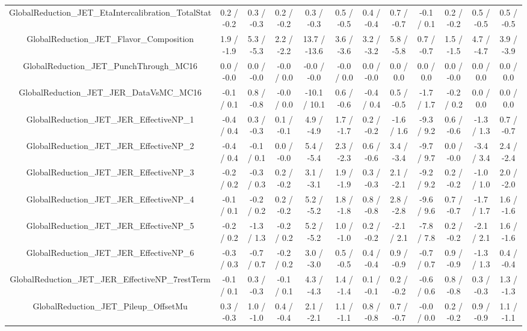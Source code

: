 \begin{table}[htbp]
\begin{center}
\begin{tabular}{|c|c|c|c|c|c|c|c|c|c|c|c|}
  GlobalReduction_JET_EtaIntercalibration_TotalStat & 0.2 / -0.2 & 0.3 / -0.3 & 0.2 / -0.2 & 0.3 / -0.3 & 0.5 / -0.5 & 0.4 / -0.4 & 0.7 / -0.7 & -0.1 / 0.1 & 0.2 / -0.2 & 0.5 / -0.5 & 0.5 / -0.5 \\ 
  GlobalReduction_JET_Flavor_Composition & 1.9 / -1.9 & 5.3 / -5.3 & 2.2 / -2.2 & 13.7 / -13.6 & 3.6 / -3.6 & 3.2 / -3.2 & 5.8 / -5.8 & 0.7 / -0.7 & 1.5 / -1.5 & 4.7 / -4.7 & 3.9 / -3.9 \\ 
  GlobalReduction_JET_PunchThrough_MC16 & 0.0 / -0.0 & 0.0 / -0.0 & -0.0 / 0.0 & -0.0 / -0.0 & -0.0 / 0.0 & 0.0 / -0.0 & 0.0 / 0.0 & 0.0 / 0.0 & 0.0 / -0.0 & 0.0 / 0.0 & 0.0 / 0.0 \\ 
  GlobalReduction_JET_JER_DataVsMC_MC16 & -0.1 / 0.1 & 0.8 / -0.8 & -0.0 / 0.0 & -10.1 / 10.1 & 0.6 / -0.6 & -0.4 / 0.4 & 0.5 / -0.5 & -1.7 / 1.7 & -0.2 / 0.2 & 0.0 / 0.0 & 0.0 / 0.0 \\ 
  GlobalReduction_JET_JER_EffectiveNP_1 & -0.4 / 0.4 & 0.3 / -0.3 & 0.1 / -0.1 & 4.9 / -4.9 & 1.7 / -1.7 & 0.2 / -0.2 & -1.6 / 1.6 & -9.3 / 9.2 & 0.6 / -0.6 & -1.3 / 1.3 & 0.7 / -0.7 \\ 
  GlobalReduction_JET_JER_EffectiveNP_2 & -0.4 / 0.4 & -0.1 / 0.1 & 0.0 / -0.0 & 5.4 / -5.4 & 2.3 / -2.3 & 0.6 / -0.6 & 3.4 / -3.4 & -9.7 / 9.7 & 0.0 / -0.0 & -3.4 / 3.4 & 2.4 / -2.4 \\ 
  GlobalReduction_JET_JER_EffectiveNP_3 & -0.2 / 0.2 & -0.3 / 0.3 & 0.2 / -0.2 & 3.1 / -3.1 & 1.9 / -1.9 & 0.3 / -0.3 & 2.1 / -2.1 & -9.2 / 9.2 & 0.2 / -0.2 & -1.0 / 1.0 & 2.0 / -2.0 \\ 
  GlobalReduction_JET_JER_EffectiveNP_4 & -0.1 / 0.1 & -0.2 / 0.2 & 0.2 / -0.2 & 5.2 / -5.2 & 1.8 / -1.8 & 0.8 / -0.8 & 2.8 / -2.8 & -9.6 / 9.6 & 0.7 / -0.7 & -1.7 / 1.7 & 1.6 / -1.6 \\ 
  GlobalReduction_JET_JER_EffectiveNP_5 & -0.2 / 0.2 & -1.3 / 1.3 & -0.2 / 0.2 & 5.2 / -5.2 & 1.0 / -1.0 & 0.2 / -0.2 & -2.1 / 2.1 & -7.8 / 7.8 & 0.2 / -0.2 & -2.1 / 2.1 & 1.6 / -1.6 \\ 
  GlobalReduction_JET_JER_EffectiveNP_6 & -0.3 / 0.3 & -0.7 / 0.7 & -0.2 / 0.2 & 3.0 / -3.0 & 0.5 / -0.5 & 0.4 / -0.4 & 0.9 / -0.9 & -0.7 / 0.7 & 0.9 / -0.9 & -1.3 / 1.3 & 0.4 / -0.4 \\ 
  GlobalReduction_JET_JER_EffectiveNP_7restTerm & -0.1 / 0.1 & 0.3 / -0.3 & -0.1 / 0.1 & 4.3 / -4.3 & 1.4 / -1.4 & 0.1 / -0.1 & 0.2 / -0.2 & -0.6 / 0.6 & 0.8 / -0.8 & 0.3 / -0.3 & 1.3 / -1.3 \\ 
  GlobalReduction_JET_Pileup_OffsetMu & 0.3 / -0.3 & 1.0 / -1.0 & 0.4 / -0.4 & 2.1 / -2.1 & 1.1 / -1.1 & 0.8 / -0.8 & 0.7 / -0.7 & -0.0 / 0.0 & 0.2 / -0.2 & 0.9 / -0.9 & 1.1 / -1.1 \\ 

\end{tabular}
\end{center}
\end{table}

